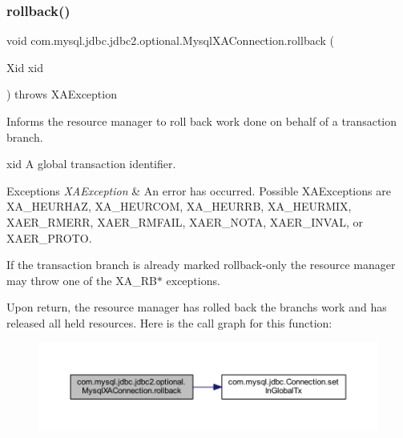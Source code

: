 \subsubsection{\texorpdfstring{rollback()}{rollback()}}
{\footnotesize\ttfamily void com.\+mysql.\+jdbc.\+jdbc2.\+optional.\+Mysql\+X\+A\+Connection.\+rollback (\begin{DoxyParamCaption}\item[{Xid}]{xid }\end{DoxyParamCaption}) throws X\+A\+Exception}

Informs the resource manager to roll back work done on behalf of a transaction branch.

xid A global transaction identifier.


\begin{DoxyExceptions}{Exceptions}
{\em X\+A\+Exception} & An error has occurred. Possible X\+A\+Exceptions are X\+A\+\_\+\+H\+E\+U\+R\+H\+AZ, X\+A\+\_\+\+H\+E\+U\+R\+C\+OM, X\+A\+\_\+\+H\+E\+U\+R\+RB, X\+A\+\_\+\+H\+E\+U\+R\+M\+IX, X\+A\+E\+R\+\_\+\+R\+M\+E\+RR, X\+A\+E\+R\+\_\+\+R\+M\+F\+A\+IL, X\+A\+E\+R\+\_\+\+N\+O\+TA, X\+A\+E\+R\+\_\+\+I\+N\+V\+AL, or X\+A\+E\+R\+\_\+\+P\+R\+O\+TO.\\
\hline
\end{DoxyExceptions}
If the transaction branch is already marked rollback-\/only the resource manager may throw one of the X\+A\+\_\+\+R\+B$\ast$ exceptions.

Upon return, the resource manager has rolled back the branch\textquotesingle{}s work and has released all held resources. Here is the call graph for this function\+:
\nopagebreak
\begin{figure}[H]
\begin{center}
\leavevmode
\includegraphics[width=350pt]{classcom_1_1mysql_1_1jdbc_1_1jdbc2_1_1optional_1_1_mysql_x_a_connection_ae3f99ed779f888fbf58e1c447862a962_cgraph}
\end{center}
\end{figure}
\mbox{\label{classcom_1_1mysql_1_1jdbc_1_1jdbc2_1_1optional_1_1_mysql_x_a_connection_a8daf9a2f37693ad1f9e8b83bcb46b1db}} 
